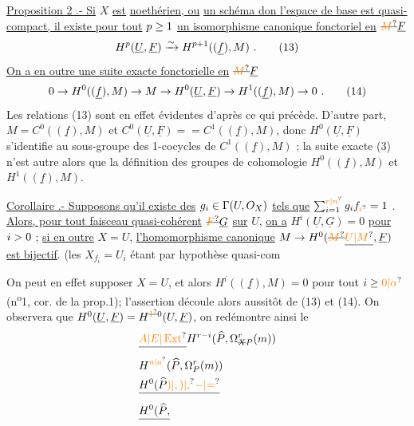 \uline{Proposition 2 .- Si} $X$ \uline{est}  \uline{noethérien, ou}  \uline{un schéma don l'espace de base est quasi-compact, il existe pour tout} $p\geq1$ \uline{un isomorphisme canonique fonctoriel en} $\deleted{\unsure{M}}\handwritten{\underline F}$
\[
H^p(\underline U,\underline F)\handwritten{\xrightarrow{\sim}}H^{p+1}((\underline f),M)\ .\tag*{(13)}
\]
\uline{On a en outre une suite exacte fonctorielle en} $\deleted{\unsure{M}}\handwritten{\underline F}$
\[
0\handwritten{\to}H^0((\underline f),M)\handwritten{\to}M\handwritten{\to}H^0(\underline U,\underline F)\handwritten{\to}H^1((\underline f),M)\handwritten{\to}0\ .\tag*{(14)}
\]
Les relations (13) sont en effet évidentes d'après ce qui précède. D'autre part,  $M=C^0((\underline f),M)$ et  $C^0(\underline U,\underline F)={}=C^1((\underline f),M)$, donc $H^0(\underline U,\underline F)$ s'identifie au sous-groupe des 1-cocycles de $C^1((\underline f),M)$ ; la suite exacte (3) n'est autre alors que  la définition des groupes de cohomologie $H^0((\underline f),M)$ et $H^1((\underline f),M)$.

\uline{Corollaire .- Supposons qu'il existe des} $g_i\in\Gamma(U,O_X)$ \uline{tels que} $\handwritten{\sum_{i=1}^{\unsure{r|n}}}g_i f_{\unsure{i}}=1$ . \uline{Alors, pour tout faisceau quasi-cohérent}  $\deleted{\unsure{F}}\handwritten{\underline G}$ \uline{sur} $U$, \uline{on a} $H^i(\underline U,\underline G)=0$ \uline{pour} $i>0$ ; \uline{si en outre} $X=U$, \uline{l'homomorphisme canonique} $M\handwritten{\to}H^0(\deleted{\unsure{M}}\underline{\unsure{U|M}},\underline F)$ \uline{est bijectif}. (les $X_{f_i}=U_i$ étant par hypothèse quasi-com

On peut en effet supposer $X=U$, et alors $H^i((\underline f),M)=0$ pour tout $i\handwritten{\geq\unsure{0|\alpha}}$ (n\textsuperscript{o}1, cor. de la prop.1); l'assertion découle alors aussitôt de (13) et (14). On observera que  $H^0(\underline U,\underline F)=H^{\deleted{\unsure{1}} \handwritten{0}}(U,\underline F)$, on redémontre ainsi le
\endgroup
\[
\begin{aligned}
&\deleted{\unsure{A|E|\operatorname{Ext}}}H^{r-i}(\widehat P,\Omega^{r}_{\deleted{X}P}(m))\\
&H^{\unsure{n|a}}(\widehat P,\Omega^{r}_{P}(m))\\
&\deleted{H^0(\widehat P\unsure{)|,)|,}\unsure{\mathord{-}|\mathord{=}}}\\
&\deleted{H^0(\widehat P,}
\end{aligned}
\]

